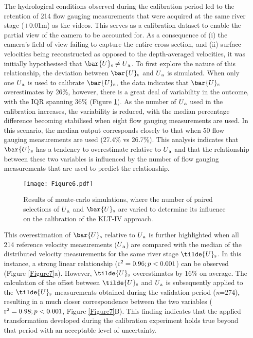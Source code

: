\documentclass[hess, manuscript]{copernicus} %
\begin{document}
The hydrological conditions observed during the calibration period led to the retention of 214 flow gauging measurements that were acquired at the same river stage ($\pm{0.01}$m) as the videos. This serves as a calibration dataset to enable the partial view of the camera to be accounted for. As a consequence of (i) the camera's field of view failing to capture the entire cross section, and (ii) surface velocities being reconstructed as opposed to the depth-averaged velocities, it was initially hypothesised that ${\bar{U}\textsubscript{s}} \neq U\textsubscript{a}$. To first explore the nature of this relationship, the deviation between $\bar{U}\textsubscript{s}$ and $U\textsubscript{a}$ is simulated. When only one $U\textsubscript{a}$ is used to calibrate $\bar{U}\textsubscript{s}$, the data indicates that $\bar{U}\textsubscript{s}$ overestimates by 26\%, however, there is a great deal of variability in the outcome, with the IQR spanning 36\% (Figure \ref{Figure6}). As the number of $U\textsubscript{a}$ used in the calibration increases, the variability is reduced, with the median percentage difference becoming stabilised when eight flow gauging measurements are used. In this scenario, the median output corresponds closely to that when 50 flow gauging measurements are used (27.4\% vs 26.7\%). This analysis indicates that $\bar{U}\textsubscript{s}$ has a tendency to overestimate relative to $U\textsubscript{a}$ and that the relationship between these two variables is influenced by the number of flow gauging measurements that are used to predict the relationship.

\begin{figure}[!htb]
\centering 
\texttt{[image: Figure6.pdf]}
\caption{Results of monte-carlo simulations, where the number of paired selections of $U\textsubscript{a}$ and $\bar{U}\textsubscript{s}$ are varied to determine its influence on the calibration of the KLT-IV approach.}
\label{Figure6} 
\end{figure}


This overestimation of $\bar{U}\textsubscript{s}$ relative to $U\textsubscript{a}$ is further highlighted when all 214 reference velocity measurements ($U\textsubscript{a}$) are compared with the median of the distributed velocity measurements for the same river stage $\tilde{U}\textsubscript{s}$. In this instance, a strong linear relationship ($\textnormal{r\textsuperscript{2}} = 0.96; p < 0.001$) can be observed (Figure \ref{Figure7}a). However, $\tilde{U}\textsubscript{s}$ overestimates by 16\% on average. The calculation of the offset between $\tilde{U}\textsubscript{s}$ and $U\textsubscript{a}$ is subsequently applied to the $\tilde{U}\textsubscript{s}$ measurements obtained during the validation period (\textit{n}=274), resulting in a much closer correspondence between the two variables ($\textnormal{r\textsuperscript{2}} = 0.98; p < 0.001$, Figure \ref{Figure7}B). This finding indicates that the applied transformation developed during the calibration experiment holds true beyond that period with an acceptable level of uncertainty.
\end{document}
